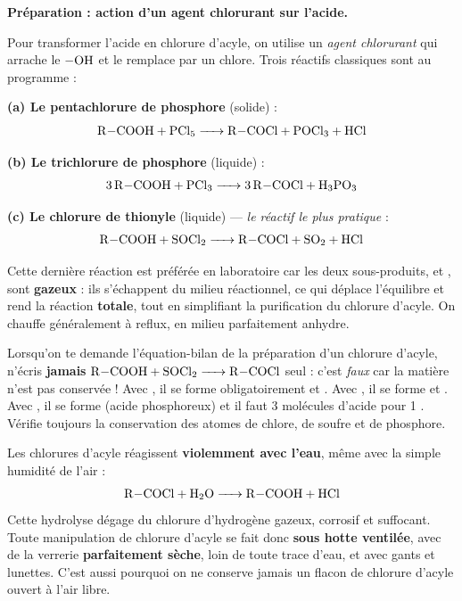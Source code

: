 \documentclass[11pt]{article}
\begin{document}
\textbf{Préparation : action d'un agent chlorurant sur l'acide.}\par

Pour transformer l'acide en chlorure d'acyle, on utilise un \emph{agent chlorurant} qui arrache le $-\ce{OH}$ et le remplace par un chlore. Trois réactifs classiques sont au programme :

\textbf{(a) Le pentachlorure de phosphore } (solide) :
\[ \ce{R-COOH + PCl5 -> R-COCl + POCl3 + HCl} \]

\textbf{(b) Le trichlorure de phosphore } (liquide) :
\[ \ce{3 R-COOH + PCl3 -> 3 R-COCl + H3PO3} \]

\textbf{(c) Le chlorure de thionyle } (liquide) — \emph{le réactif le plus pratique} :
\[ \ce{R-COOH + SOCl2 -> R-COCl + SO2 + HCl} \]

Cette dernière réaction est préférée en laboratoire car les deux sous-produits,  et , sont \textbf{gazeux} : ils s'échappent du milieu réactionnel, ce qui déplace l'équilibre et rend la réaction \textbf{totale}, tout en simplifiant la purification du chlorure d'acyle. On chauffe généralement à reflux, en milieu parfaitement anhydre.

\begin{attention}
Lorsqu'on te demande l'équation-bilan de la préparation d'un chlorure d'acyle, n'écris \textbf{jamais} $\ce{R-COOH + SOCl2 -> R-COCl}$ seul : c'est \emph{faux} car la matière n'est pas conservée ! Avec , il se forme obligatoirement  et . Avec , il se forme  et . Avec , il se forme  (acide phosphoreux) et il faut 3 molécules d'acide pour 1 . Vérifie toujours la conservation des atomes de chlore, de soufre et de phosphore.
\end{attention}

\begin{attention}
Les chlorures d'acyle réagissent \textbf{violemment avec l'eau}, même avec la simple humidité de l'air :
\[ \ce{R-COCl + H2O -> R-COOH + HCl} \]
Cette hydrolyse dégage du chlorure d'hydrogène gazeux, corrosif et suffocant. Toute manipulation de chlorure d'acyle se fait donc \textbf{sous hotte ventilée}, avec de la verrerie \textbf{parfaitement sèche}, loin de toute trace d'eau, et avec gants et lunettes. C'est aussi pourquoi on ne conserve jamais un flacon de chlorure d'acyle ouvert à l'air libre.
\end{attention}
\end{document}
